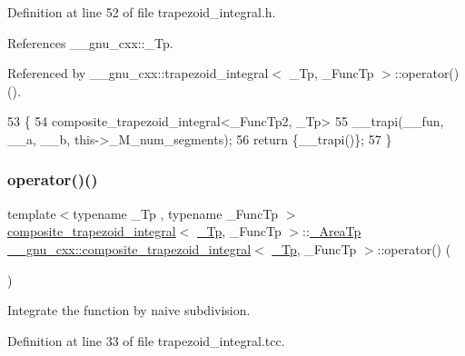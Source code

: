 Definition at line 52 of file trapezoid\+\_\+integral.\+h.



References \+\_\+\+\_\+gnu\+\_\+cxx\+::\+\_\+\+Tp.



Referenced by \+\_\+\+\_\+gnu\+\_\+cxx\+::trapezoid\+\_\+integral$<$ \+\_\+\+Tp, \+\_\+\+Func\+Tp $>$\+::operator()().


\begin{DoxyCode}
53         \{
54           composite\_trapezoid\_integral<\_FuncTp2, \_Tp>
55             \_\_trapi(\_\_fun, \_\_a, \_\_b, this->\_M\_num\_segments);
56           \textcolor{keywordflow}{return} \{\_\_trapi()\};
57         \}
\end{DoxyCode}
\mbox{\label{class____gnu__cxx_1_1composite__trapezoid__integral_aad283e15b63ce1ad40cdaa834ec4fcb6}} 
\subsubsection{\texorpdfstring{operator()()}{operator()()}}
{\footnotesize\ttfamily template$<$typename \+\_\+\+Tp , typename \+\_\+\+Func\+Tp $>$ \\
\hyperlink{class____gnu__cxx_1_1composite__trapezoid__integral}{composite\+\_\+trapezoid\+\_\+integral}$<$ \hyperlink{namespace____gnu__cxx_a3b19a9c800ca194374ef9172290f7d79}{\+\_\+\+Tp}, \+\_\+\+Func\+Tp $>$\+::\hyperlink{class____gnu__cxx_1_1composite__trapezoid__integral_a0839ba042e2636869679bbf343b2a930}{\+\_\+\+Area\+Tp} \hyperlink{class____gnu__cxx_1_1composite__trapezoid__integral}{\+\_\+\+\_\+gnu\+\_\+cxx\+::composite\+\_\+trapezoid\+\_\+integral}$<$ \hyperlink{namespace____gnu__cxx_a3b19a9c800ca194374ef9172290f7d79}{\+\_\+\+Tp}, \+\_\+\+Func\+Tp $>$\+::operator() (\begin{DoxyParamCaption}{ }\end{DoxyParamCaption})}

Integrate the function by naive subdivision. 

Definition at line 33 of file trapezoid\+\_\+integral.\+tcc.



